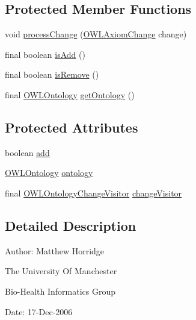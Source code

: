 \subsection*{Protected Member Functions}
\begin{DoxyCompactItemize}
\item 
void \hyperlink{classorg_1_1semanticweb_1_1owlapi_1_1util_1_1_o_w_l_ontology_change_filter_a9d6f39708211ec198a1b37f3813fa4e0}{process\-Change} (\hyperlink{classorg_1_1semanticweb_1_1owlapi_1_1model_1_1_o_w_l_axiom_change}{O\-W\-L\-Axiom\-Change} change)
\item 
final boolean \hyperlink{classorg_1_1semanticweb_1_1owlapi_1_1util_1_1_o_w_l_ontology_change_filter_a06084e7b7901f522616957d267eff3e9}{is\-Add} ()
\item 
final boolean \hyperlink{classorg_1_1semanticweb_1_1owlapi_1_1util_1_1_o_w_l_ontology_change_filter_a93b27611d278cb39ac4313f88e8b4395}{is\-Remove} ()
\item 
final \hyperlink{interfaceorg_1_1semanticweb_1_1owlapi_1_1model_1_1_o_w_l_ontology}{O\-W\-L\-Ontology} \hyperlink{classorg_1_1semanticweb_1_1owlapi_1_1util_1_1_o_w_l_ontology_change_filter_ad84435b276df3ba4a6ea9cfd1a6a6430}{get\-Ontology} ()
\end{DoxyCompactItemize}
\subsection*{Protected Attributes}
\begin{DoxyCompactItemize}
\item 
boolean \hyperlink{classorg_1_1semanticweb_1_1owlapi_1_1util_1_1_o_w_l_ontology_change_filter_a8b310d9a157ce212d8c4a056ffa52977}{add}
\item 
\hyperlink{interfaceorg_1_1semanticweb_1_1owlapi_1_1model_1_1_o_w_l_ontology}{O\-W\-L\-Ontology} \hyperlink{classorg_1_1semanticweb_1_1owlapi_1_1util_1_1_o_w_l_ontology_change_filter_a36b96af05ab8665dfa2c22e4c593bb15}{ontology}
\item 
final \hyperlink{interfaceorg_1_1semanticweb_1_1owlapi_1_1model_1_1_o_w_l_ontology_change_visitor}{O\-W\-L\-Ontology\-Change\-Visitor} \hyperlink{classorg_1_1semanticweb_1_1owlapi_1_1util_1_1_o_w_l_ontology_change_filter_af1e78bf02701bb8b59aa6d527330daf6}{change\-Visitor}
\end{DoxyCompactItemize}


\subsection{Detailed Description}
Author\-: Matthew Horridge\par
 The University Of Manchester\par
 Bio-\/\-Health Informatics Group\par
 Date\-: 17-\/\-Dec-\/2006\par
\par
 

